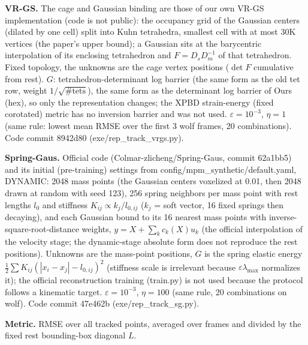 \textbf{VR-GS.} The cage and Gaussian binding are those of our own VR-GS implementation (code is not public): the occupancy grid of the Gaussian centers (dilated by one cell) split into Kuhn tetrahedra, smallest cell with at most 30K vertices (the paper's upper bound); a Gaussian sits at the barycentric interpolation of its enclosing tetrahedron and $F=D_sD_m^{-1}$ of that tetrahedron. Fixed topology, the unknowns are the cage vertex positions ($\det F$ cumulative from rest). $G$: tetrahedron-determinant log barrier (the same form as the old tet row, weight $1/\sqrt{\#\text{tets}}$), the same form as the determinant log barrier of Ours (hex), so only the representation changes; the XPBD strain-energy (fixed corotated) metric has no inversion barrier and was not used. $\varepsilon=10^{-3}$, $\eta=1$ (same rule: lowest mean RMSE over the first 3 wolf frames, 20 combinations). Code commit 8942d80 (exe/rep\_track\_vrgs.py).

\textbf{Spring-Gaus.} Official code (Colmar-zlicheng/Spring-Gaus, commit 62a1bb5) and its initial (pre-training) settings from config/mpm\_synthetic/default.yaml, DYNAMIC: 2048 mass points (the Gaussian centers voxelized at 0.01, then 2048 drawn at random with seed 123), 256 spring neighbors per mass point with rest lengths $l_0$ and stiffness $K_{ij}\propto k_j/l_{0,ij}$ ($k_j$ = soft vector, 16 fixed springs then decaying), and each Gaussian bound to its 16 nearest mass points with inverse-square-root-distance weights, $y=X+\sum_k c_k(X)u_k$ (the official interpolation of the velocity stage; the dynamic-stage absolute form does not reproduce the rest positions). Unknowns are the mass-point positions, $G$ is the spring elastic energy $\tfrac12\sum K_{ij}(|x_i-x_j|-l_{0,ij})^2$ (stiffness scale is irrelevant because $\varepsilon\lambda_{\max}$ normalizes it); the official reconstruction training (train.py) is not used because the protocol follows a kinematic target. $\varepsilon=10^{-3}$, $\eta=100$ (same rule, 20 combinations on wolf). Code commit 47e462b (exe/rep\_track\_sg.py).

\textbf{Metric.} RMSE over all tracked points, averaged over frames and divided by the fixed rest bounding-box diagonal $L$.

